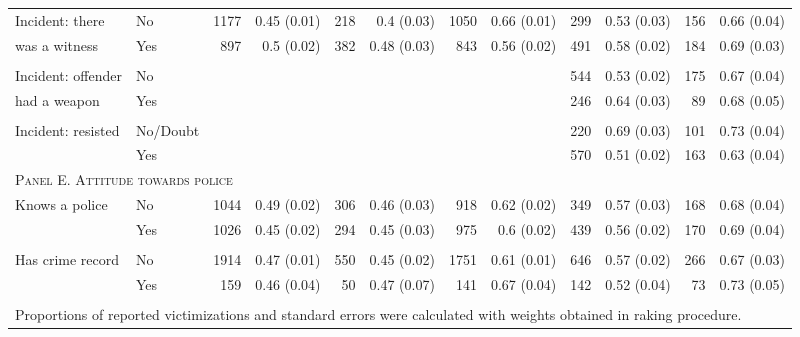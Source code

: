 \begin{tabular}{p{1.2in}p{1.2in}rrrrrrrrrr}
Incident: there%
& No & 1177 & 0.45 (0.01) & 218 & 0.4 (0.03) & 1050 & 0.66 (0.01) & 299 & 0.53 (0.03) & 156 & 0.66 (0.04) \\ 
was a witness  & Yes & 897 & 0.5 (0.02) & 382 & 0.48 (0.03) & 843 & 0.56 (0.02) & 491 & 0.58 (0.02) & 184 & 0.69 (0.03) \\ 
 	\vspace{1pt}\\
Incident: offender %
& No &  &  &  &  &  &  & 544 & 0.53 (0.02) & 175 & 0.67 (0.04) \\ 
had a weapon  & Yes &  &  &  &  &  &  & 246 & 0.64 (0.03) & 89 & 0.68 (0.05) \\ 
 	\vspace{1pt}\\
Incident: resisted & No/Doubt &  &  &  &  &  &  & 220 & 0.69 (0.03) & 101 & 0.73 (0.04) \\ 
 & Yes &  &  &  &  &  &  & 570 & 0.51 (0.02) & 163 & 0.63 (0.04) \\
	 \midrule
		\multicolumn{12}{l}{\textsc{Panel E. Attitude towards police}} \\
Knows a police & No & 1044 & 0.49 (0.02) & 306 & 0.46 (0.03) & 918 & 0.62 (0.02) & 349 & 0.57 (0.03) & 168 & 0.68 (0.04) \\ 
 & Yes & 1026 & 0.45 (0.02) & 294 & 0.45 (0.03) & 975 & 0.6 (0.02) & 439 & 0.56 (0.02) & 170 & 0.69 (0.04) \\
 	\vspace{1pt}\\ 
Has crime record & No & 1914 & 0.47 (0.01) & 550 & 0.45 (0.02) & 1751 & 0.61 (0.01) & 646 & 0.57 (0.02) & 266 & 0.67 (0.03) \\ 
 & Yes & 159 & 0.46 (0.04) & 50 & 0.47 (0.07) & 141 & 0.67 (0.04) & 142 & 0.52 (0.04) & 73 & 0.73 (0.05) \\ 

	\bottomrule
	\vspace{1pt}\\
	\multicolumn{12}{l}{\small Proportions of reported victimizations and standard errors were calculated with weights obtained in raking procedure.}
\end{tabular}